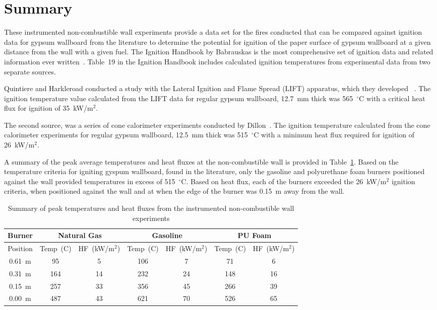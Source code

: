 \documentclass[twoside]{uocthesis}
\begin{document}
{\section{Summary}

These instrumented non-combustible wall experiments provide a data set for the fires conducted that can be compared against ignition data for gypsum wallboard from the literature to determine the potential for ignition of the paper surface of gypsum wallboard at a given distance from the wall with a given fuel. The Ignition Handbook by Babrauskas is the most comprehensive set of ignition data and related information ever written~\cite{Babrauskas:2003}.  Table~19 in the Ignition Handbook includes calculated ignition temperatures from experimental data from two separate sources.

Quintiere and Harkleroad conducted a study with the Lateral Ignition and Flame Spread (LIFT) apparatus, which they developed ~\cite{ASTM_E1321,Quintiere:1985}.
The ignition temperature value calculated from the LIFT data for regular gypsum wallboard, 12.7~mm thick was 565~$^{\circ}$C with a critical heat flux for ignition of 35~kW/m$^2$.

The second source, was a series of cone calorimeter experiments conducted by Dillon~\cite{ASTM_E1354,Dillon:1998}. The ignition temperature calculated from the cone calorimeter experiments for regular gypsum wallboard, 12.5~mm thick was 515~$^{\circ}$C with a minimum heat flux required for ignition of 26~kW/m$^2$.

A summary of the peak average temperatures and heat fluxes at the non-combustible wall is provided in Table~\ref{tab:TW_Summary}.   Based on the temperature criteria for igniting gyspum wallboard, found in the literature, only the gasoline and polyurethane foam burners positioned against the wall provided temperatures in excess of 515~$^{\circ}$C.  Based on heat flux, each of the burners exceeded the 26~kW/m$^2$ ignition criteria, when positioned against the wall and at when the edge of the burner was 0.15~m away from the wall.    

\begin{table}
	\centering
	\footnotesize
	\begin{tabular}{|c|c|c|c|c|c|c|}
		\hline {Burner} & \multicolumn{2}{c}{Natural Gas} & \multicolumn{2}{c}{Gasoline} & \multicolumn{2}{c|}{PU Foam} \\
		\hline  Position & Temp~(C) & HF~(kW/m$^{2}$) & Temp~(C) & HF~(kW/m$^{2}$) & Temp~(C) & HF~(kW/m$^{2}$) 	\\
		\hline \hline 0.61~m & 95 & 5 & 106 & 7 & 71 & 6 \\
		\hline 0.31~m & 164 & 14 & 232 & 24 & 148 & 16	\\
		\hline 0.15~m & 257 & 33 & 356 & 45 & 266 & 39	\\
		\hline 0.00~m & 487 & 43 & 621 & 70 & 526 & 65 	\\
		\hline
	\end{tabular}
	\caption[Summary of instrumented non-combustible wall experiments]{Summary of peak temperatures and heat fluxes from the instrumented non-combustible wall experiments}
	\label{tab:TW_Summary}
\end{table}


}
\end{document}
